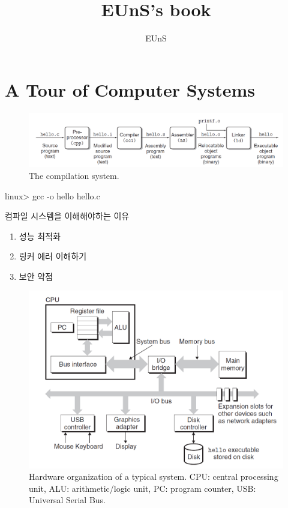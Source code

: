 \documentclass[chapter,oneside]{oblivoir}
\begin{document}
    
    \title{EUnS's book}
    \author{ EUnS }

    \maketitle

    \tableofcontents



\chapter{A Tour of Computer Systems}


\begin{figure}[h!]
    \centering
    \includegraphics[scale=0.3]{pic/pic1}
    \caption{The compilation system.}
\end{figure}

linux> gcc -o hello hello.c

컴파일 시스템을 이해해야하는 이유

\begin{enumerate}
    \item 성능 최적화
    \item 링커 에러 이해하기
    \item 보안 약점
\end{enumerate}


\begin{figure}[h!]
    \centering
    \includegraphics[scale=0.5]{pic/pic2}
    \caption{Hardware organization
    of a typical system. CPU:
    central processing unit,
    ALU: arithmetic/logic unit,
    PC: program counter, USB:
    Universal Serial Bus.}
\end{figure}
\end{document}
